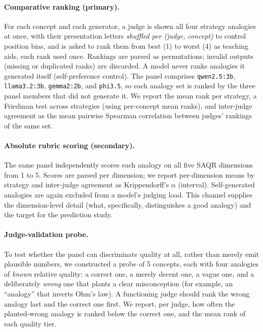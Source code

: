 \documentclass[11pt]{article}
\newcommand{\result}[1]{#1}  %
\begin{document}
\paragraph{Comparative ranking (primary).}
For each concept and each generator, a judge is shown all four strategy analogies
at once, with their presentation letters \emph{shuffled per (judge, concept)} to
control position bias, and is asked to rank them from best (1) to worst (4) as
teaching aids, each rank used once. Rankings are parsed as permutations; invalid
outputs (missing or duplicated ranks) are discarded. A model never ranks
analogies it generated itself (self-preference control). The panel comprises
\texttt{qwen2.5:3b}, \texttt{llama3.2:3b}, \texttt{gemma2:2b}, and
\texttt{phi3.5}, so each analogy set is ranked by the three panel members that
did not generate it. We report the mean rank per strategy, a Friedman test across
strategies (using per-concept mean ranks), and inter-judge agreement as the mean
pairwise Spearman correlation between judges' rankings of the same set.

\paragraph{Absolute rubric scoring (secondary).}
The same panel independently scores each analogy on all five SAQR dimensions from
1 to 5. Scores are parsed per dimension; we report per-dimension means by
strategy and inter-judge agreement as Krippendorff's $\alpha$ (interval).
Self-generated analogies are again excluded from a model's judging load. This
channel supplies the dimension-level detail (what, specifically, distinguishes a
good analogy) and the target for the prediction study.

\paragraph{Judge-validation probe.}
To test whether the panel can discriminate quality at all, rather than merely
emit plausible numbers, we constructed a probe of \result{5} concepts, each with
four analogies of \emph{known} relative quality: a correct one, a merely decent
one, a vague one, and a deliberately \emph{wrong} one that plants a clear
misconception (for example, an ``analogy'' that inverts Ohm's law). A functioning
judge should rank the wrong analogy last and the correct one first. We report,
per judge, how often the planted-wrong analogy is ranked below the correct one,
and the mean rank of each quality tier.
\end{document}

